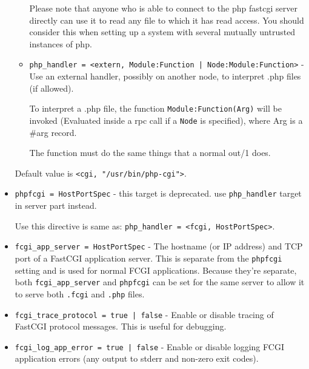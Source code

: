 \documentclass[11pt,oneside,english]{book}
\begin{document}
\begin{itemize}
\begin{itemize}
                Please note that anyone who is able to connect to the php
                fastcgi server directly can use it to read any file to which it
                has read access. You should consider this when setting up a
                system with several mutually untrusted instances of php.

              \item \verb+php_handler = <extern, Module:Function | Node:Module:Function>+
                - Use an external handler, possibly on another node, to
                interpret .php files (if allowed).

                To interpret a .php file, the function
                \verb+Module:Function(Arg)+ will be invoked (Evaluated inside a
                rpc call if a \verb+Node+ is specified), where Arg is a \#arg{}
                record.

                The function must do the same things that a normal out/1 does.

              \end{itemize}
              Default value is \verb+<cgi, "/usr/bin/php-cgi">+.

\item       \verb+phpfcgi = HostPortSpec+ -
              this target is deprecated. use \verb+php_handler+ target in server
              part instead.

              Use this directive is same as: \verb+php_handler = <fcgi, HostPortSpec>+.

\item       \verb+fcgi_app_server = HostPortSpec+ -
              The hostname (or IP address) and TCP port of a
              FastCGI application server. This is separate from the
              \verb+phpfcgi+ setting and is used for normal FCGI
              applications. Because they're separate, both
              \verb+fcgi_app_server+ and \verb+phpfcgi+ can be set for
              the same server to allow it to serve both \verb+.fcgi+
              and \verb+.php+ files.

\item       \verb+fcgi_trace_protocol = true | false+ -
              Enable or disable tracing of FastCGI protocol
              messages. This is useful for debugging.

\item       \verb+fcgi_log_app_error = true | false+ -
              Enable or disable logging FCGI application errors (any
              output to stderr and non-zero exit codes).


\end{itemize}
\end{document}

